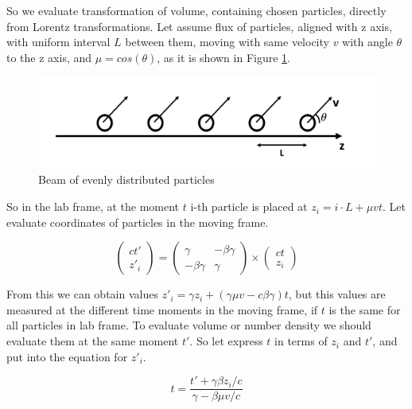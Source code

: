 So we evaluate transformation of volume, containing chosen particles, directly from Lorentz transformations. Let assume flux of particles, aligned with z axis, with uniform interval $L$ between them, moving with same velocity $v$ with angle $\theta$ to the z axis, and $\mu = cos(\theta)$, as it is shown in Figure \ref{VolumeTransform}.

\begin{figure}[h]
	\centering
	\includegraphics[width=12.5 cm]{./fig/VolumeTransform.png} 
	\caption{Beam of evenly distributed particles}
	\label{VolumeTransform}
\end{figure}

So in the lab frame, at the moment $t$ i-th particle is placed at $z_i = i\cdot L + \mu v t$. Let evaluate coordinates of particles in the moving frame.

\begin{equation}\label{lorentz_z}
	\left(\begin{array}{c}
		ct'\\
		z'_i
	\end{array}
	\right)
	= \left(
	\begin{array}{cc}
		\gamma & -\beta\gamma\\
		-\beta\gamma & \gamma
	\end{array}
	\right)
	\times
	\left(\begin{array}{c}
		ct\\
		z_i
	\end{array}
	\right)
\end{equation}

From this we can obtain values $z'_i = \gamma z_i + (\gamma \mu v - c\beta \gamma)t$, but this values are measured at the different time moments in the moving frame, if $t$ is the same for all particles in lab frame. To evaluate volume or number density we should evaluate them at the same moment $t'$. So let express $t$ in terms of $z_i$ and $t'$, and put into the equation for $z'_i$.

\begin{equation}
	t=\frac{t'+\gamma\beta z_i/c}{\gamma - \beta \mu v/c}
\end{equation}

